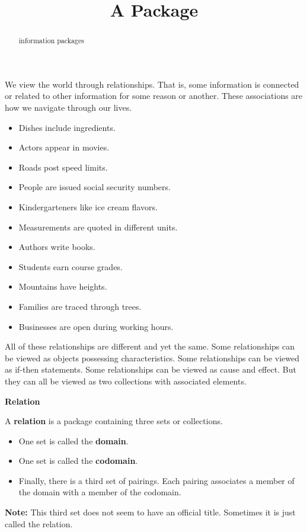 \documentclass{ximera}
\title{A Package}
\begin{document}
\begin{abstract}
information packages
\end{abstract}
\maketitle


We view the world through relationships. That is, some information is connected or related to other information for some reason or another. These associations are how we navigate through our lives.

\begin{itemize}
\item Dishes include ingredients.
\item Actors appear in movies.
\item Roads post speed limits.
\item People are issued social security numbers.
\item Kindergarteners like ice cream flavors.
\item Measurements are quoted in different units.
\item Authors write books.
\item Students earn course grades.
\item Mountains have heights.
\item Families are traced through trees.
\item Businesses are open during working hours.
\end{itemize}


All of these relationships are different and yet the same.  Some relationships can be viewed as objects possessing characteristics. Some relationships can be viewed as if-then statements.  Some relationships can be viewed as cause and effect. But they can all be viewed as two collections with associated elements.







\begin{definition} \textbf{\textcolor{green!50!black}{Relation}} 


A \textbf{relation} is a package containing three sets or collections. 


\begin{itemize}
\item One set is called the \textbf{\textcolor{purple!85!blue}{domain}}. 
\item One set is called the \textbf{\textcolor{purple!85!blue}{codomain}}.  
\item Finally, there is a third set of pairings.  Each pairing associates a member of the domain with a member of the codomain. 
\end{itemize}

\textbf{Note:} This third set does not seem to have an official title. Sometimes it is just called the relation.

\end{definition}
\end{document}
